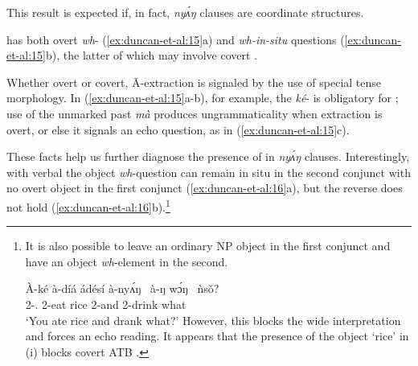 \documentclass[output=paper,modfonts,nonflat,
]{langsci/langscibook}
\begin{document}
\noindent This result is expected if, in fact, \textit{ny\'{ʌ}ŋ} clauses are coordinate structures.

 has both overt \textit{wh}- (\ref{ex:duncan-et-al:15}a) and \textit{wh-in-situ} questions (\ref{ex:duncan-et-al:15}b), the latter of which may involve covert .

\ea\label{ex:duncan-et-al:15}
\z
\z

\noindent Whether overt or covert, \={A}-extraction is signaled by the use of special  tense morphology. In (\ref{ex:duncan-et-al:15}a-b), for example, the  \textit{ké}- is obligatory for ; use of the unmarked past  \textit{mà} produces ungrammaticality when extraction is overt, or else it signals an echo question, as in (\ref{ex:duncan-et-al:15}c).

These facts help us further diagnose the presence of  in \textit{ny\'{ʌ}ŋ} clauses. Interestingly, with verbal  the object \textit{wh}-question can remain {in situ} in the second conjunct with no overt object in the first conjunct (\ref{ex:duncan-et-al:16}a), but the reverse does not hold (\ref{ex:duncan-et-al:16}b).\footnote{It is also possible to leave an ordinary NP object in the first conjunct and have an object \textit{wh}-element in the second.

\ea\label{ex:duncan-et-al:i}
\gll \`{A}-ké à-díá ádésí à-ny\'{ʌ}ŋ~ à-ŋ w\'ɔŋ~ ǹs\v{o}? \\
2{\SG-\PST.\FOC} 2{\SG}-eat rice 2{\SG}-and 2{\SG}-drink what \\
\glt `You ate rice and drank what?'
\z
However, this blocks the wide  interpretation and forces an echo reading. It appears that the presence of the object `rice' in (i) blocks covert ATB .}

\ea\label{ex:duncan-et-al:16}
\z
\z
\end{document}
